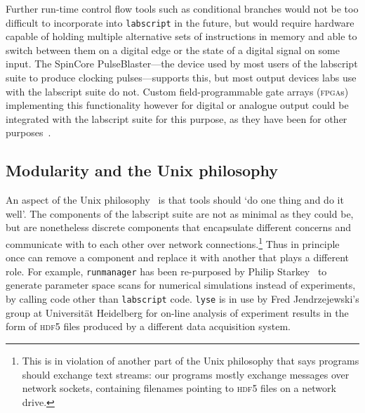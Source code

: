 Further run-time control flow tools such as conditional branches would not be too difficult to incorporate into \texttt{labscript} in the future, but would require hardware capable of holding multiple alternative sets of instructions in memory and able to switch between them on a digital edge or the state of a digital signal on some input. The SpinCore PulseBlaster---the device used by most users of the labscript suite to produce clocking pulses---supports this, but most output devices labs use with the labscript suite do not. Custom field-programmable gate arrays (\textsc{fpga}s) implementing this functionality however for digital or analogue output could be integrated with the labscript suite for this purpose, as they have been for other purposes~\cite{gill_optical_2016}.

\subsection{Modularity and the Unix philosophy}\label{sec:unix_philosophy}

An aspect of the Unix philosophy~\cite{gancarz_unix_1995} is that tools should `do one thing and do it well'. The components of the labscript suite are not as minimal as they could be, but are nonetheless discrete components that encapsulate different concerns and communicate with to each other over network connections.\footnote{This is in violation of another part of the Unix philosophy that says programs should exchange text streams: our programs mostly exchange messages over network sockets, containing filenames pointing to \textsc{hdf5} files on a network drive.} Thus in principle once can remove a component and replace it with another that plays a different role. For example, \texttt{runmanager} has been re-purposed by Philip Starkey~\cite{starkey_thesis_2018} to generate parameter space scans for numerical simulations instead of experiments, by calling code other than \texttt{labscript} code. \texttt{lyse} is in use by Fred Jendrzejewski's group at Universit\"at Heidelberg for on-line analysis of experiment results in the form of \textsc{hdf5} files produced by a different data acquisition system.

